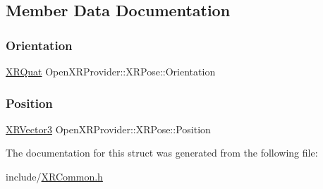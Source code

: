\subsection{Member Data Documentation}
\mbox{\label{struct_open_x_r_provider_1_1_x_r_pose_ab121b9646f6c7afc5530a42e275b040f}} 
\subsubsection{\texorpdfstring{Orientation}{Orientation}}
{\footnotesize\ttfamily \mbox{\hyperlink{struct_open_x_r_provider_1_1_x_r_quat}{X\+R\+Quat}} Open\+X\+R\+Provider\+::\+X\+R\+Pose\+::\+Orientation}

\mbox{\label{struct_open_x_r_provider_1_1_x_r_pose_ac882b1e6289497e3dd59a1befd66afab}} 
\subsubsection{\texorpdfstring{Position}{Position}}
{\footnotesize\ttfamily \mbox{\hyperlink{struct_open_x_r_provider_1_1_x_r_vector3}{X\+R\+Vector3}} Open\+X\+R\+Provider\+::\+X\+R\+Pose\+::\+Position}



The documentation for this struct was generated from the following file\+:\begin{DoxyCompactItemize}
\item 
include/\mbox{\hyperlink{_x_r_common_8h}{X\+R\+Common.\+h}}\end{DoxyCompactItemize}
